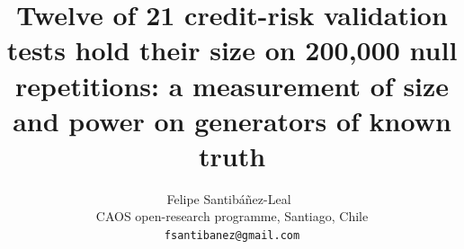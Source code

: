 \documentclass[11pt]{article}
\title{Twelve of 21 credit-risk validation tests hold their size on 200,000 null repetitions: a measurement of size and power on generators of known truth}
\author{Felipe Santib\'a\~nez-Leal~\orcidlink{0000-0002-0150-3246}\\
\small CAOS open-research programme, Santiago, Chile\\
\small \texttt{fsantibanez@gmail.com}}
\date{\docdate}
\begin{document}
\maketitle
\headerblock

\begin{abstract}

\end{abstract}
















\end{document}
